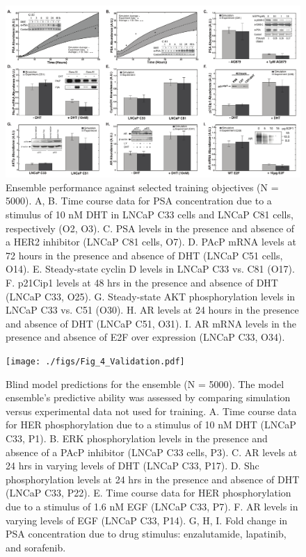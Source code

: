 \documentclass[12pt]{article}
\begin{document}
\begin{figure}\centering
\includegraphics[width=1.0\textwidth]{./figs/Fig_2_Training.pdf}
\caption{Ensemble performance against selected training objectives (N = 5000). A, B. Time course data for PSA concentration due to a stimulus of 10 nM DHT in LNCaP C33 cells and LNCaP C81 cells, respectively (O2, O3). C. PSA levels in the presence and absence of a HER2 inhibitor (LNCaP C81 cells, O7). D. PAcP mRNA levels at 72 hours in the presence and absence of DHT (LNCaP C51 cells, O14). E. Steady-state cyclin D levels in LNCaP C33 vs. C81 (O17). F. p21Cip1 levels at 48 hrs in the presence and absence of DHT (LNCaP C33, O25). G. Steady-state AKT phosphorylation levels in LNCaP C33 vs. C51 (O30). H. AR levels at 24 hours in the presence and absence of DHT (LNCaP C51, O31). I. AR mRNA levels in the presence and absence of E2F over expression (LNCaP C33, O34).}
\label{fg:Training}
\end{figure}

\clearpage

\begin{figure}\centering
\texttt{[image: ./figs/Fig\_4\_Validation.pdf]}
\caption{Blind model predictions for the ensemble (N = 5000). The model ensemble’s predictive ability was assessed by comparing simulation versus experimental data not used for training. A. Time course data for HER phosphorylation due to a stimulus of 10 nM DHT (LNCaP C33, P1). B. ERK phosphorylation levels in the presence and absence of a PAcP inhibitor (LNCaP C33 cells, P3). C. AR levels at 24 hrs in varying levels of DHT (LNCaP C33, P17). D. Shc phosphorylation levels at 24 hrs in the presence and absence of DHT (LNCaP C33, P22). E. Time course data for HER phosphorylation due to a stimulus of 1.6 nM EGF (LNCaP C33, P7). F. AR levels in varying levels of EGF (LNCaP C33, P14). G, H, I. Fold change in PSA concentration due to drug stimulus: enzalutamide, lapatinib, and sorafenib.}
\label{fg:Validation}
\end{figure}
\end{document}
